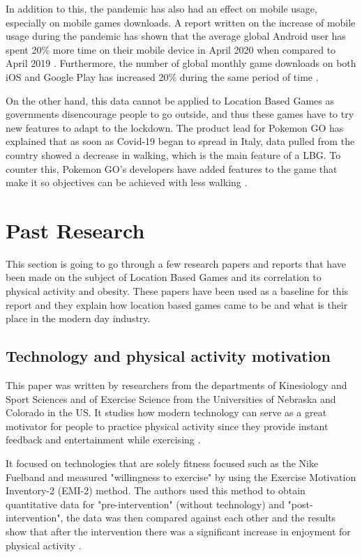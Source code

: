\documentclass{dissertation}
\begin{document}
In addition to this, the pandemic has also had an effect on mobile usage, especially on mobile games downloads. A report written on the increase of mobile usage during the 
pandemic has shown that the average global Android user has spent 20\% more time on their mobile device in April 2020 when compared to April 2019 \citep{Sydow20}. 
Furthermore, the number of global monthly game downloads on both iOS and Google Play has increased 20\% during the same period of time \citep{Sydow20}.

On the other hand, this data cannot be applied to Location Based Games as governments disencourage people to go outside, and thus these games have to try new features 
to adapt to the lockdown. The product lead for Pokemon GO has explained that as soon as Covid-19 began to spread in Italy, data pulled from the country showed a decrease 
in walking, which is the main feature of a LBG. To counter this, Pokemon GO's developers have added features to the game that make it so objectives can be achieved with less walking \citep{Francis20}.

\section{Past Research}

This section is going to go through a few research papers and reports that have been made on the subject of Location Based Games and its correlation to physical activity and 
obesity. These papers have been used as a baseline for this report and they explain how location based games came to be and what is their place in the modern day industry.

\subsection{Technology and physical activity motivation}

This paper was written by researchers from the departments of Kinesiology and Sport Sciences and of Exercise Science from the Universities of Nebraska and Colorado in the US. 
It studies how modern technology can serve as a great motivator for people to practice physical activity since they provide instant feedback and entertainment while exercising 
\citep{Bice15}.

It focused on technologies that are solely fitness focused such as the Nike Fuelband and measured "willingness to exercise" by using the Exercise Motivation Inventory-2 (EMI-2) 
method. The authors used this method to obtain quantitative data for "pre-intervention" (without technology) and "post-intervention", the data was then compared against each other
and the results show that after the intervention there was a significant increase in enjoyment for physical activity \citep{Bice15}.
\end{document}
